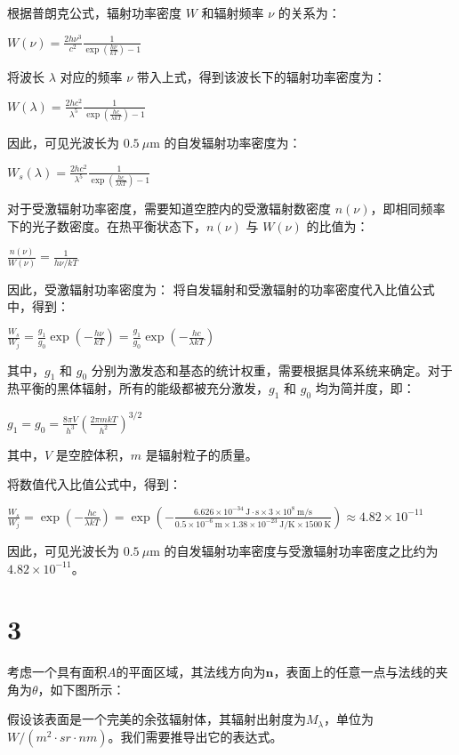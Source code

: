 \documentclass[12pt, a4paper, oneside]{article}
\begin{document}
\begin{spacing}{2.0}
根据普朗克公式，辐射功率密度 $W$ 和辐射频率 $\nu$ 的关系为：

$W(\nu) = \frac{2h\nu^3}{c^2} \frac{1}{\exp\left(\frac{h\nu}{kT}\right)-1}$

将波长 $\lambda$ 对应的频率 $\nu$ 带入上式，得到该波长下的辐射功率密度为：

$W(\lambda) = \frac{2hc^2}{\lambda^5} \frac{1}{\exp\left(\frac{hc}{\lambda kT}\right)-1}$

因此，可见光波长为 $0.5\ \mu\text{m}$ 的自发辐射功率密度为：

$W_s(\lambda) = \frac{2hc^2}{\lambda^5} \frac{1}{\exp\left(\frac{hc}{\lambda kT}\right)-1}$

对于受激辐射功率密度，需要知道空腔内的受激辐射数密度 $n(\nu)$，即相同频率下的光子数密度。在热平衡状态下，$n(\nu)$ 与 $W(\nu)$ 的比值为：

$\frac{n(\nu)}{W(\nu)} = \frac{1}{h\nu/kT}$

因此，受激辐射功率密度为：
将自发辐射和受激辐射的功率密度代入比值公式中，得到：

$\frac{W_s}{W_j} = \frac{g_1}{g_0}\exp\left(-\frac{h\nu}{kT}\right) = \frac{g_1}{g_0}\exp\left(-\frac{hc}{\lambda kT}\right)$

其中，$g_1$ 和 $g_0$ 分别为激发态和基态的统计权重，需要根据具体系统来确定。对于热平衡的黑体辐射，所有的能级都被充分激发，$g_1$ 和 $g_0$ 均为简并度，即：

$g_1 = g_0 = \frac{8\pi V}{h^3} \left(\frac{2\pi m kT}{h^2}\right)^{3/2}$

其中，$V$ 是空腔体积，$m$ 是辐射粒子的质量。

将数值代入比值公式中，得到：

$\frac{W_s}{W_j} = \exp\left(-\frac{hc}{\lambda kT}\right) = \exp\left(-\frac{6.626 \times 10^{-34}\ \text{J}\cdot\text{s} \times 3 \times 10^8\ \text{m/s}}{0.5 \times 10^{-6}\ \text{m} \times 1.38 \times 10^{-23}\ \text{J/K} \times 1500\ \text{K}}\right) \approx 4.82 \times 10^{-11}$

因此，可见光波长为 $0.5\ \mu\text{m}$ 的自发辐射功率密度与受激辐射功率密度之比约为 $4.82 \times 10^{-11}$。
\section{3}

考虑一个具有面积$A$的平面区域，其法线方向为$\mathbf{n}$，表面上的任意一点与法线的夹角为$\theta$，如下图所示：

假设该表面是一个完美的余弦辐射体，其辐射出射度为$M_{\lambda}$，单位为$W/(m^2\cdot sr\cdot nm)$。我们需要推导出它的表达式。


\end{spacing}
\end{document}
